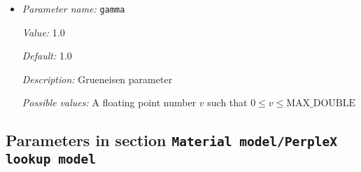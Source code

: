 \begin{itemize}
{\it Possible values:} A floating point number $v$ such that $0 \leq v \leq \text{MAX\_DOUBLE}$
\item {\it Parameter name:} {\tt gamma}
\label{parameters:Material model/Nondimensional model/gamma}
\label{parameters:Material_20model/Nondimensional_20model/gamma}


{\it Value:} 1.0


{\it Default:} 1.0


{\it Description:} Grueneisen parameter


{\it Possible values:} A floating point number $v$ such that $0 \leq v \leq \text{MAX\_DOUBLE}$
\end{itemize}

\subsection{Parameters in section \tt Material model/PerpleX lookup model}
\label{parameters:Material_20model/PerpleX_20lookup_20model}

